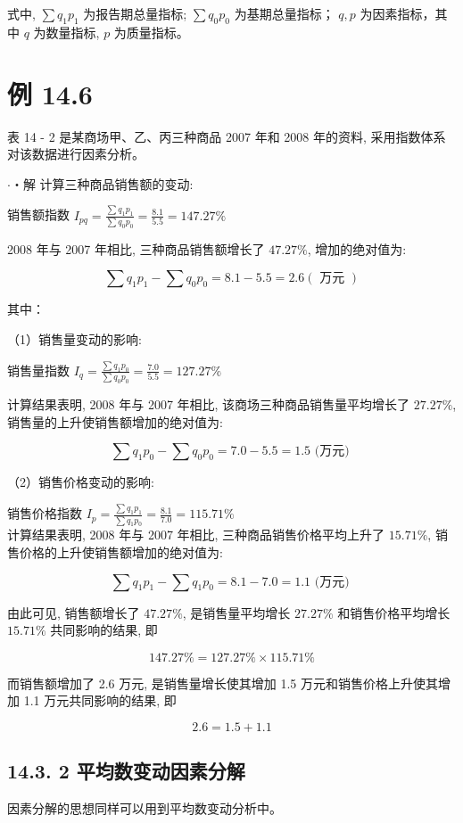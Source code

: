 \documentclass[10pt]{article}
\begin{document}
\begin{CJK*}{UTF8}{bsmi}
式中, $\sum q_{1} p_{1}$ 为报告期总量指标; $\sum q_{0} p_{0}$ 为基期总量指标； $q, p$ 为因素指标，其中 $q$ 为数量指标, $p$ 为质量指标。

\section*{例 14.6}
表 14 - 2 是某商场甲、乙、丙三种商品 2007 年和 2008 年的资料, 采用指数体系对该数据进行因素分析。

$\cdot$・解 计算三种商品销售额的变动:

销售额指数 $I_{p q}=\frac{\sum q_{1} p_{1}}{\sum q_{0} p_{0}}=\frac{8.1}{5.5}=147.27 \%$

2008 年与 2007 年相比, 三种商品销售额增长了 $47.27 \%$, 增加的绝对值为:

$$
\sum q_{1} p_{1}-\sum q_{0} p_{0}=8.1-5.5=2.6(\text { 万元 })
$$

其中：

（1）销售量变动的影响:

销售量指数 $I_{q}=\frac{\sum q_{1} p_{0}}{\sum q_{0} p_{0}}=\frac{7.0}{5.5}=127.27 \%$

计算结果表明, 2008 年与 2007 年相比, 该商场三种商品销售量平均增长了 $27.27 \%$,销售量的上升使销售额增加的绝对值为:

$$
\sum q_{1} p_{0}-\sum q_{0} p_{0}=7.0-5.5=1.5 \text { (万元) }
$$

（2）销售价格变动的影响:

销售价格指数 $I_{p}=\frac{\sum q_{1} p_{1}}{\sum q_{1} p_{0}}=\frac{8.1}{7.0}=115.71 \%$\\
计算结果表明, 2008 年与 2007 年相比, 三种商品销售价格平均上升了 $15.71 \%$, 销售价格的上升使销售额增加的绝对值为:

$$
\sum q_{1} p_{1}-\sum q_{1} p_{0}=8.1-7.0=1.1 \text { (万元) }
$$

由此可见, 销售额增长了 $47.27 \%$, 是销售量平均增长 $27.27 \%$ 和销售价格平均增长 $15.71 \%$ 共同影响的结果, 即

$$
147.27 \%=127.27 \% \times 115.71 \%
$$

而销售额增加了 2.6 万元, 是销售量增长使其增加 1.5 万元和销售价格上升使其增加 1.1 万元共同影响的结果, 即

$$
2.6=1.5+1.1
$$

\subsection*{14.3. 2 平均数变动因素分解}
因素分解的思想同样可以用到平均数变动分析中。


\end{CJK*}
\end{document}
